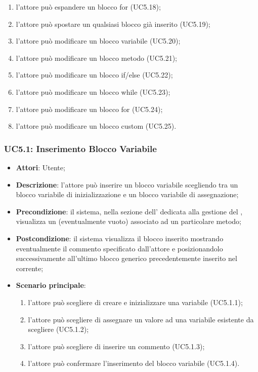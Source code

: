 \begin{itemize}
\begin{enumerate}
		\item l'attore può espandere un blocco for (UC5.18);
		\item l'attore può spostare un qualsiasi blocco già inserito (UC5.19);
		\item l'attore può modificare un blocco variabile (UC5.20);
		\item l'attore può modificare un blocco metodo (UC5.21);
		\item l'attore può modificare un blocco if/else (UC5.22);
		\item l'attore può modificare un blocco while (UC5.23);
		\item l'attore può modificare un blocco for (UC5.24);
		\item l'attore può modificare un blocco custom (UC5.25).
	\end{enumerate}
\end{itemize}

\subsubsection{UC5.1: Inserimento Blocco Variabile}
\label{UC5.1}
\begin{itemize}
	\item \textbf{Attori}: Utente;
	\item \textbf{Descrizione}: l'attore può inserire un blocco variabile scegliendo tra un blocco variabile di inizializzazione e un blocco variabile di assegnazione;
	\item \textbf{Precondizione}: il sistema, nella sezione dell' dedicata alla gestione del , visualizza un  (eventualmente vuoto) associato ad un particolare metodo;
	\item \textbf{Postcondizione}: il sistema visualizza il blocco inserito mostrando eventualmente il commento specificato dall'attore e posizionandolo successivamente all'ultimo blocco generico precedentemente inserito nel  corrente;
	\item \textbf{Scenario principale}:
	\begin{enumerate}
		\item l'attore può scegliere di creare e inizializzare una variabile (UC5.1.1);
		\item l'attore può scegliere di assegnare un valore ad una variabile esistente da scegliere (UC5.1.2);
		\item l'attore può scegliere di inserire un commento (UC5.1.3);
		\item l'attore può confermare l'inserimento del blocco variabile (UC5.1.4).
	\end{enumerate}
\end{itemize}

